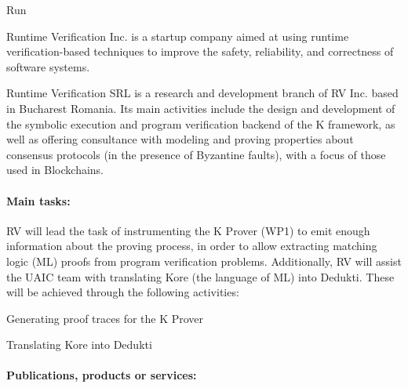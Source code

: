 \begin{sitedescription}{Run}



Runtime Verification Inc. is a startup company aimed at using runtime verification-based
techniques to improve the safety, reliability, and correctness of software systems.

Runtime Verification SRL is a research and development branch of RV Inc. based
in Bucharest Romania.  Its main activities include the design and development of
the symbolic execution and program verification backend of the K framework,
as well as offering consultance with modeling and proving properties about
consensus protocols (in the presence of Byzantine faults),
with a focus of those used in Blockchains.

\paragraph*{Main tasks:}


RV will lead the task of instrumenting the K Prover (WP1) to emit enough information
about the proving process, in order to allow extracting matching logic (ML) proofs from
program verification problems.  Additionally, RV will assist the UAIC team with
translating Kore (the language of ML) into Dedukti.
These will be achieved through the following activities:


\begin{compactitem}
\item Generating proof traces for the K Prover
\item Translating Kore into Dedukti 
\end{compactitem}

\paragraph*{Publications, products or services:}



\end{sitedescription}
